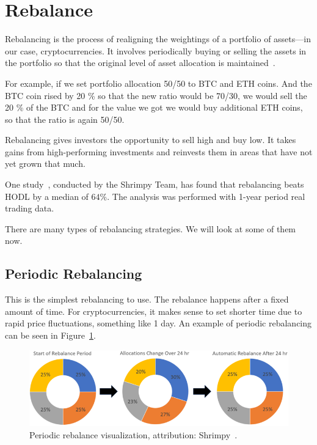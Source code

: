 \section{Rebalance}
\label{section-rebalance}
Rebalancing is the process of realigning the weightings of a portfolio of assets---in our case, cryptocurrencies. It involves periodically buying or selling the assets in the portfolio so that the original level of asset allocation is maintained~\cite{investopedia-rebalancing}.

For example, if we set portfolio allocation 50/50 to BTC and ETH coins. And the BTC coin rised by 20 \% so that the new ratio would be 70/30, we would sell the 20 \% of the BTC and for the value we got we would buy additional ETH coins, so that the ratio is again 50/50.

Rebalancing gives investors the opportunity to sell high and buy low. It takes gains from high-performing investments and reinvests them in areas that have not yet grown that much.

One study~\cite{portfolio-rebalancing}, conducted by the Shrimpy Team, has found that rebalancing beats HODL by a median of $64\%$. The analysis was performed with 1-year period real trading data.

There are many types of rebalancing strategies. We will look at some of them now.

\subsection*{Periodic Rebalancing}
This is the simplest rebalancing to use. The rebalance happens after a fixed amount of time. For cryptocurrencies, it makes sense to set shorter time due to rapid price fluctuations, something like 1 day. An example of periodic rebalancing can be seen in Figure~\ref{periodic-rebalance-figure}.

\begin{figure}[!hbt]
    \centering
    \includegraphics[width=\columnwidth]{figures/periodic-rebalance.png}
    \caption{Periodic rebalance visualization, attribution: Shrimpy~\cite{portfolio-rebalancing}.}
    \label{periodic-rebalance-figure}
\end{figure}

